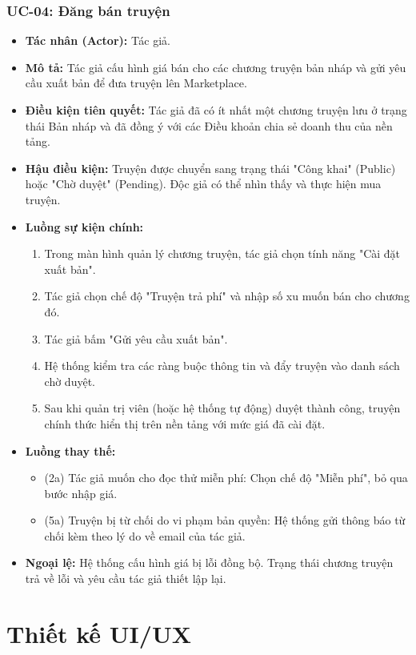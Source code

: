 \subsubsection{UC-04: Đăng bán truyện}
\begin{itemize}
    \item \textbf{Tác nhân (Actor):} Tác giả.
    \item \textbf{Mô tả:} Tác giả cấu hình giá bán cho các chương truyện bản nháp và gửi yêu cầu xuất bản để đưa truyện lên Marketplace.
    \item \textbf{Điều kiện tiên quyết:} Tác giả đã có ít nhất một chương truyện lưu ở trạng thái Bản nháp và đã đồng ý với các Điều khoản chia sẻ doanh thu của nền tảng.
    \item \textbf{Hậu điều kiện:} Truyện được chuyển sang trạng thái "Công khai" (Public) hoặc "Chờ duyệt" (Pending). Độc giả có thể nhìn thấy và thực hiện mua truyện.
    \item \textbf{Luồng sự kiện chính:}
    \begin{enumerate}
        \item Trong màn hình quản lý chương truyện, tác giả chọn tính năng "Cài đặt xuất bản".
        \item Tác giả chọn chế độ "Truyện trả phí" và nhập số xu muốn bán cho chương đó.
        \item Tác giả bấm "Gửi yêu cầu xuất bản".
        \item Hệ thống kiểm tra các ràng buộc thông tin và đẩy truyện vào danh sách chờ duyệt.
        \item Sau khi quản trị viên (hoặc hệ thống tự động) duyệt thành công, truyện chính thức hiển thị trên nền tảng với mức giá đã cài đặt.
    \end{enumerate}
    \item \textbf{Luồng thay thế:} 
    \begin{itemize}
        \item (2a) Tác giả muốn cho đọc thử miễn phí: Chọn chế độ "Miễn phí", bỏ qua bước nhập giá.
        \item (5a) Truyện bị từ chối do vi phạm bản quyền: Hệ thống gửi thông báo từ chối kèm theo lý do về email của tác giả.
    \end{itemize}
    \item \textbf{Ngoại lệ:} Hệ thống cấu hình giá bị lỗi đồng bộ. Trạng thái chương truyện trả về lỗi và yêu cầu tác giả thiết lập lại.
\end{itemize}

\section{Thiết kế UI/UX}
\label{sec:uiux}

